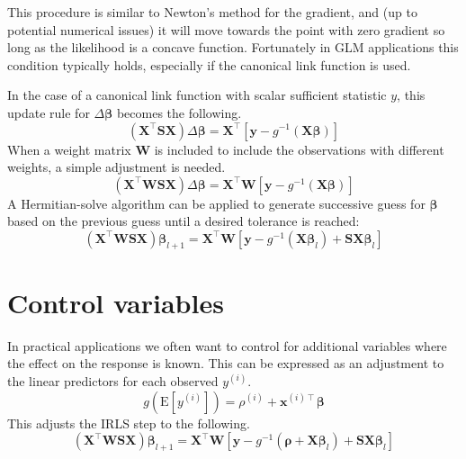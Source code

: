 \documentclass{article}
\newcommand{\bbeta}{\boldsymbol{\beta}}
\begin{document}
This procedure is similar to Newton's method for the gradient, and (up to
potential numerical issues) it will move towards the point with zero gradient so
long as the likelihood is a concave function. Fortunately in GLM applications
this condition typically holds, especially if the canonical link function is
used.

In the case of a canonical link function with scalar sufficient statistic
\(y\), this update rule for \(\Delta \bbeta\) becomes the
following.
\begin{equation}
\left( \mathbf{X}^\intercal \mathbf{S} \mathbf{X} \right) \Delta
\bbeta = \mathbf{X}^\intercal \left[ \mathbf{y} -
g^{-1}(\mathbf{X}\bbeta)\right]
\end{equation}
When a weight matrix \(\mathbf{W}\) is included to include the observations
with different weights, a simple adjustment is needed.
\begin{equation}
\left( \mathbf{X}^\intercal \mathbf{W} \mathbf{S} \mathbf{X} \right) \Delta
\bbeta = \mathbf{X}^\intercal \mathbf{W} \left[ \mathbf{y} -
g^{-1}(\mathbf{X}\bbeta)\right]
\end{equation}
A Hermitian-solve algorithm can be applied to generate successive guess for
\(\bbeta\) based on the previous guess until a desired tolerance
is reached:
\begin{equation}
\left( \mathbf{X}^\intercal \mathbf{W} \mathbf{S} \mathbf{X} \right)
\bbeta_{l+1} = \mathbf{X}^\intercal \mathbf{W} \left[ \mathbf{y} -
g^{-1}\left(\mathbf{X}\bbeta_l\right) + \mathbf{S} \mathbf{X}
\bbeta_l\right]
\end{equation}

\section{Control variables}

In practical applications we often want to control for additional variables
where the effect on the response is known. This can be expressed as an
adjustment to the linear predictors for each observed \(y^{(i)}\).
\[ g(\textrm{E}[y^{(i)}]) = \rho^{(i)} + \mathbf{x}^{(i)\intercal} \bbeta \]
This adjusts the IRLS step to the following.
\begin{equation}
\left( \mathbf{X}^\intercal \mathbf{W} \mathbf{S} \mathbf{X} \right)
\bbeta_{l+1} = \mathbf{X}^\intercal \mathbf{W} \left[ \mathbf{y} -
g^{-1}\left(\boldsymbol{\rho} + \mathbf{X}\bbeta_l\right) +
\mathbf{S} \mathbf{X} \bbeta_l\right]
\end{equation}
\end{document}
